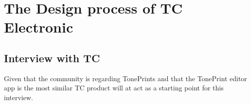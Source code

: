 \chapter{The Design process of TC Electronic}
\label{Interview}



\section{Interview with TC}
\label{InterviewInputs}

Given that the community is regarding TonePrints and that the TonePrint editor app is the most similar TC product will at act as a starting point for this interview.

